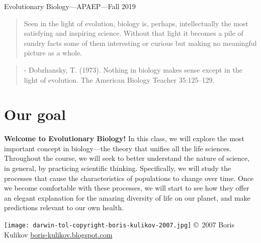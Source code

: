 



\setlength{\parindent}{0.25in}

\begin{mytitle}
    Evolutionary Biology---APAEP---Fall 2019
\end{mytitle}


\begin{quote}
    \large\sffamily
    Seen in the light of evolution, biology is, perhaps, intellectually the
    most satisfying and inspiring science. Without that light it becomes a pile
    of sundry facts some of them interesting or curious but making no
    meaningful picture as a whole.
\end{quote}

\begin{quote}
    \small\sffamily
    - Dobzhansky, T. (1973). Nothing in biology makes sense except in the light
    of evolution. The American Biology Teacher 35:125--129.
\end{quote}

\noindent
\begin{minipage}{.52\textwidth}
    \section{Our goal}
    
    \noindent\textbf{Welcome to Evolutionary Biology!}
    In this class, we will explore the most important concept in biology---the
    theory that unifies all the life sciences.
    Throughout the course, we will seek to better understand the nature of
    science, in general, by practicing scientific thinking.
    Specifically, we will study the processes that cause the characteristics of
    populations to change over time.
    Once we become comfortable with these processes, we will start to see how
    they offer an elegant explanation for the amazing diversity of life on our
    planet,
    and make predictions relevant to our own health.
\end{minipage}%
\begin{minipage}{.47\textwidth}
    \centering
    \texttt{[image: darwin-tol-copyright-boris-kulikov-2007.jpg]}
    {\tiny \copyright~2007 Boris Kulikov \href{http://boris-kulikov.blogspot.com/}{boris-kulikov.blogspot.com}}
\end{minipage}


